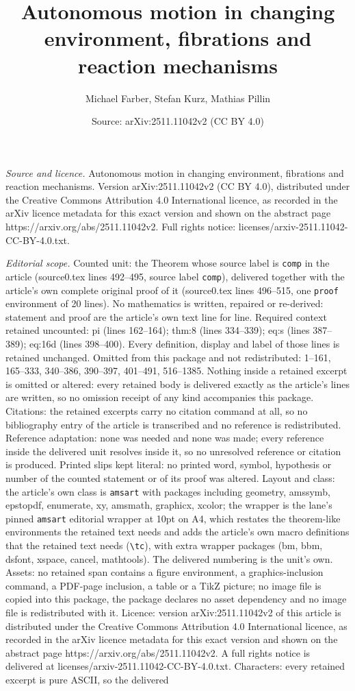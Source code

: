 \documentclass[10pt,a4paper]{amsart}
\title[Autonomous motion in changing environment, fibrations and re]{Autonomous motion in changing environment, fibrations and reaction mechanisms}
\author{Michael Farber, Stefan Kurz, Mathias Pillin}
\date{Source: arXiv:2511.11042v2 (CC BY 4.0)}
\begin{document}
\maketitle

\noindent\emph{Source and licence.} Autonomous motion in changing environment, fibrations and reaction mechanisms. Version arXiv:2511.11042v2 (CC BY 4.0), distributed under the Creative Commons Attribution 4.0 International licence, as recorded in the arXiv licence metadata for this exact version and shown on the abstract page https://arxiv.org/abs/2511.11042v2. Full rights notice: licenses/arxiv-2511.11042-CC-BY-4.0.txt.\par\smallskip

\noindent\textit{Editorial scope.} Counted unit: the Theorem whose source label is \texttt{comp} in the article (source0.tex lines 492--495, source label \texttt{comp}), delivered together with the article's own complete original proof of it (source0.tex lines 496--515, one \texttt{proof} environment of 20 lines). No mathematics is written, repaired or re-derived: statement and proof are the article's own text line for line. Required context retained uncounted: pi (lines 162--164); thm:8 (lines 334--339); eq:s (lines 387--389); eq:16d (lines 398--400). Every definition, display and label of those lines is retained unchanged. Omitted from this package and not redistributed: 1--161, 165--333, 340--386, 390--397, 401--491, 516--1385. Nothing inside a retained excerpt is omitted or altered: every retained body is delivered exactly as the article's lines are written, so no omission receipt of any kind accompanies this package. Citations: the retained excerpts carry no citation command at all, so no bibliography entry of the article is transcribed and no reference is redistributed. Reference adaptation: none was needed and none was made; every reference inside the delivered unit resolves inside it, so no unresolved reference or citation is produced. Printed slips kept literal: no printed word, symbol, hypothesis or number of the counted statement or of its proof was altered. Layout and class: the article's own class is \texttt{amsart} with packages including geometry, amssymb, epstopdf, enumerate, xy, amsmath, graphicx, xcolor; the wrapper is the lane's pinned \texttt{amsart} editorial wrapper at 10pt on A4, which restates the theorem-like environments the retained text needs and adds the article's own macro definitions that the retained text needs (\texttt{\textbackslash tc}), with extra wrapper packages (bm, bbm, dsfont, xspace, cancel, mathtools). The delivered numbering is the unit's own. Assets: no retained span contains a figure environment, a graphics-inclusion command, a PDF-page inclusion, a table or a TikZ picture; no image file is copied into this package, the package declares no asset dependency and no image file is redistributed with it. Licence: version arXiv:2511.11042v2 of this article is distributed under the Creative Commons Attribution 4.0 International licence, as recorded in the arXiv licence metadata for this exact version and shown on the abstract page https://arxiv.org/abs/2511.11042v2. A full rights notice is delivered at licenses/arxiv-2511.11042-CC-BY-4.0.txt. Characters: every retained excerpt is pure ASCII, so the delivered 
\end{document}
